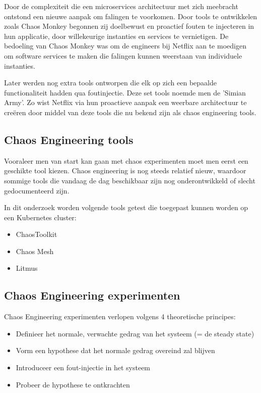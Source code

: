 Door de complexiteit die een microservices architectuur met zich meebracht ontstond een nieuwe aanpak om falingen te voorkomen. Door tools te ontwikkelen zoals Chaos Monkey begonnen zij doelbewust en proactief fouten te injecteren in hun applicatie, door willekeurige instanties en services te vernietigen. De bedoeling van Chaos Monkey was om de engineers bij Netflix aan te moedigen om software services te maken die falingen kunnen weerstaan van individuele instanties. \autocite{Basiri2016}  

Later werden nog extra tools ontworpen die elk op zich een bepaalde functionaliteit hadden qua foutinjectie. Deze set tools noemde men de 'Simian Army'. Zo wist Netflix via hun proactieve aanpak een weerbare architectuur te creëren door middel van deze tools die nu bekend zijn als chaos engineering tools.

\subsection{Chaos Engineering tools}

Vooraleer men van start kan gaan met chaos experimenten moet men eerst een geschikte tool kiezen. Chaos engineering is nog steeds relatief nieuw, waardoor sommige tools die vandaag de dag beschikbaar zijn nog onderontwikkeld of slecht gedocumenteerd zijn.

In dit onderzoek worden volgende tools getest die toegepast kunnen worden op een Kubernetes cluster: 
\begin{itemize}
    \item ChaosToolkit
    \item Chaos Mesh
    \item Litmus
\end{itemize} 

\subsection{Chaos Engineering experimenten}

Chaos Engineering experimenten verlopen volgens 4 theoretische principes: 
\begin{itemize}
    \item Definieer het normale, verwachte gedrag van het systeem (= de steady state)
    \item Vorm een hypothese dat het normale gedrag overeind zal blijven 
    \item Introduceer een fout-injectie in het systeem
    \item Probeer de hypothese te ontkrachten
\end{itemize}

